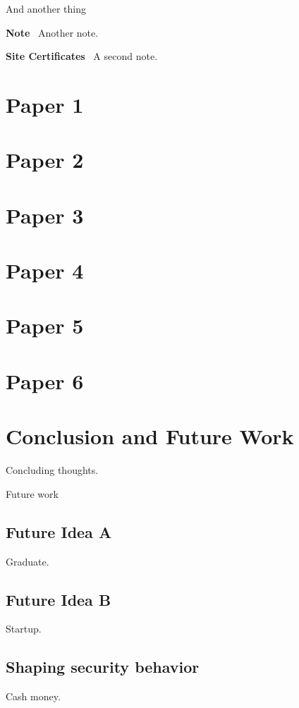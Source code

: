 \documentclass{thesis-umich}
\renewcommand{\paragraph}[1]{\medskip\noindent\textbf{#1}\,\,\,}
\begin{document}
And another thing

\paragraph{Note}
Another note.

\paragraph{Site Certificates}
A second note.

\chapter{Paper 1}

\chapter{Paper 2}

\chapter{Paper 3}

\chapter{Paper 4}

\chapter{Paper 5}

\chapter{Paper 6}


\chapter{Conclusion and Future Work}

Concluding thoughts.

Future work

\section{Future Idea A}
Graduate.

\section{Future Idea B}
Startup.

\section{Shaping security behavior}
Cash money.



\end{document}
